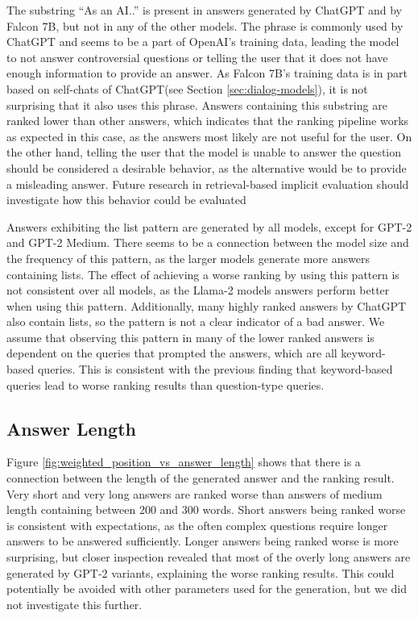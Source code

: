 The substring ``As an AI..'' is present in answers generated by ChatGPT and by Falcon 7B, but not in any of the other models.
The phrase is commonly used by ChatGPT and seems to be a part of OpenAI's training data, leading the model to not answer controversial questions or telling the user that it does not have enough information to provide an answer.
As Falcon 7B's training data is in part based on self-chats of ChatGPT(see Section \ref{sec:dialog-models}), it is not surprising that it also uses this phrase.
Answers containing this substring are ranked lower than other answers, which indicates that the ranking pipeline works as expected in this case, as the answers most likely are not useful for the user.
On the other hand, telling the user that the model is unable to answer the question should be considered a desirable behavior, as the alternative would be to provide a misleading answer.
Future research in retrieval-based implicit evaluation should investigate how this behavior could be evaluated

Answers exhibiting the list pattern are generated by all models, except for GPT-2 and GPT-2 Medium.
There seems to be a connection between the model size and the frequency of this pattern, as the larger models generate more answers containing lists.
The effect of achieving a worse ranking by using this pattern is not consistent over all models, as the Llama-2 models answers perform better when using this pattern.
Additionally, many highly ranked answers by ChatGPT also contain lists, so the pattern is not a clear indicator of a bad answer.
We assume that observing this pattern in many of the lower ranked answers is dependent on the queries that prompted the answers, which are all keyword-based queries.
This is consistent with the previous finding that keyword-based queries lead to worse ranking results than question-type queries.

\subsection{Answer Length}
Figure \ref{fig:weighted_position_vs_answer_length} shows that there is a connection between the length of the generated answer and the ranking result.
Very short and very long answers are ranked worse than answers of medium length containing between 200 and 300 words.
Short answers being ranked worse is consistent with expectations, as the often complex questions require longer answers to be answered sufficiently.
Longer answers being ranked worse is more surprising, but closer inspection revealed that most of the overly long answers are generated by GPT-2 variants, explaining the worse ranking results.
This could potentially be avoided with other parameters used for the generation, but we did not investigate this further.

